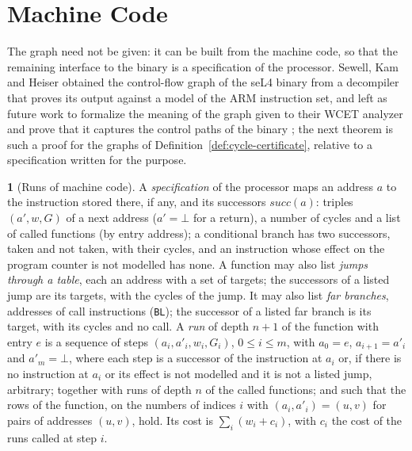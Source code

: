 \documentclass[oneside,english]{amsart}
\numberwithin{equation}{section}
\theoremstyle{plain}
\theoremstyle{definition}
\newtheorem{defn}[thm]{\protect\definitionname}
\theoremstyle{plain}
\theoremstyle{plain}
\theoremstyle{remark}
\providecommand{\definitionname}{Definition}
\begin{document}
\section{Machine Code}
\label{sec:machine}

The graph need not be given: it can be built from the machine code, so that the remaining interface to the binary is a specification of the processor. Sewell, Kam and Heiser obtained the control-flow graph of the seL4 binary from a decompiler that proves its output against a model of the ARM instruction set, and left as future work to formalize the meaning of the graph given to their WCET analyzer and prove that it captures the control paths of the binary \cite{sewell2017high}; the next theorem is such a proof for the graphs of Definition~\ref{def:cycle-certificate}, relative to a specification written for the purpose.

\begin{defn}[Runs of machine code]
\label{def:machine-run}
A \emph{specification} of the processor maps an address $a$ to the instruction stored there, if any, and its successors $\mathit{succ}(a)$: triples $(a', w, G)$ of a next address ($a' = \bot$ for a return), a number of cycles and a list of called functions (by entry address); a conditional branch has two successors, taken and not taken, with their cycles, and an instruction whose effect on the program counter is not modelled has none. A function may also list \emph{jumps through a table}, each an address with a set of targets; the successors of a listed jump are its targets, with the cycles of the jump. It may also list \emph{far branches}, addresses of call instructions (\texttt{BL}); the successor of a listed far branch is its target, with its cycles and no call. A \emph{run} of depth $n + 1$ of the function with entry $e$ is a sequence of steps $(a_i, a'_i, w_i, G_i)$, $0 \le i \le m$, with $a_0 = e$, $a_{i+1} = a'_i$ and $a'_m = \bot$, where each step is a successor of the instruction at $a_i$ or, if there is no instruction at $a_i$ or its effect is not modelled and it is not a listed jump, arbitrary; together with runs of depth $n$ of the called functions; and such that the rows of the function, on the numbers of indices $i$ with $(a_i, a'_i) = (u, v)$ for pairs of addresses $(u, v)$, hold. Its cost is $\sum_i (w_i + c_i)$, with $c_i$ the cost of the runs called at step $i$.
\end{defn}
\end{document}

